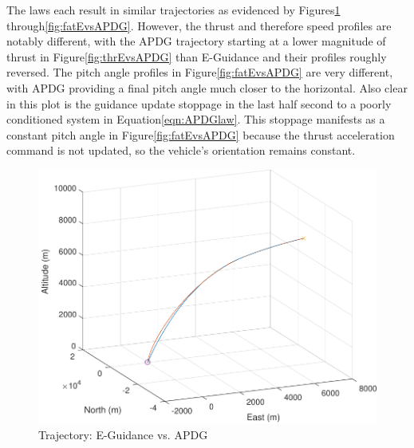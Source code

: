 The laws each result in similar trajectories as evidenced by Figures\:\ref{fig:trajEvsAPDG} through\:\ref{fig:fatEvsAPDG}. However, the thrust and therefore speed profiles are notably different, with the APDG trajectory starting at a lower magnitude of thrust in Figure\:\ref{fig:thrEvsAPDG} than E-Guidance and their profiles roughly reversed. The pitch angle profiles in Figure\:\ref{fig:fatEvsAPDG} are very different, with APDG providing a final pitch angle much closer to the horizontal. Also clear in this plot is the guidance update stoppage in the last half second to a poorly conditioned system in Equation\:\ref{eqn:APDGlaw}. This stoppage manifests as a constant pitch angle in Figure\:\ref{fig:fatEvsAPDG} because the thrust acceleration command is not updated, so the vehicle's orientation remains constant.

\begin{figure}[H]
	\centering
	\begin{minipage}{4.5 in}
		\includegraphics[width=\linewidth]{Figures/trajEvsAPDG.pdf}
		\caption{Trajectory: E-Guidance vs. APDG \label{fig:trajEvsAPDG} }
	\end{minipage}
\end{figure}

